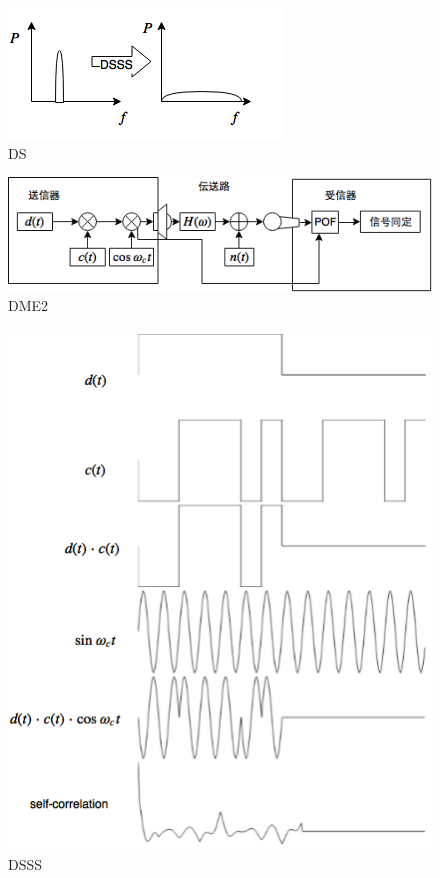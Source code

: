 \begin{figure}[p]\centering
  \hspace{-2mm}\includegraphics[clip,width=1.1\hsize]{img/DS.png}
  \caption{DS}\label{fig:DS}
\end{figure}

\begin{figure}[p]\centering
  \hspace{-2mm}\includegraphics[clip,width=1.1\hsize]{img/DME2.png}
  \caption{DME2}\label{fig:DME2}
\end{figure}

\begin{figure}[p]\centering
  \hspace{-2mm}\includegraphics[clip,width=1.1\hsize]{img/DSSS.png}
  \caption{DSSS}\label{fig:DSSS}
\end{figure}

